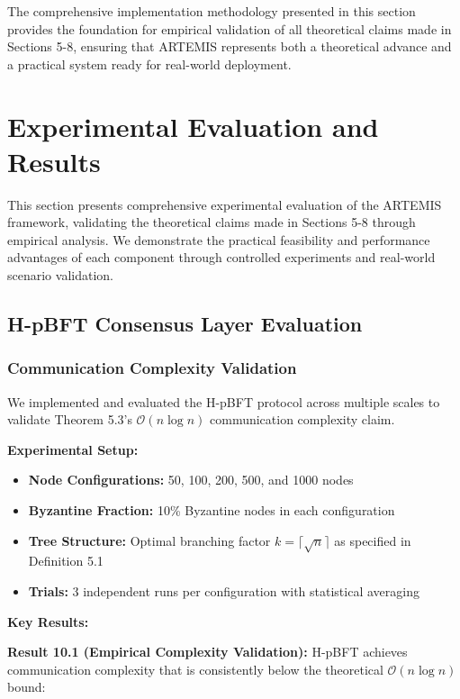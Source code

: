 \documentclass[conference]{IEEEtran}
\newcommand{\bigO}{\mathcal{O}}
\begin{document}
The comprehensive implementation methodology presented in this section provides the foundation for empirical validation of all theoretical claims made in Sections 5-8, ensuring that ARTEMIS represents both a theoretical advance and a practical system ready for real-world deployment.

\section{Experimental Evaluation and Results}

This section presents comprehensive experimental evaluation of the ARTEMIS framework, validating the theoretical claims made in Sections 5-8 through empirical analysis. We demonstrate the practical feasibility and performance advantages of each component through controlled experiments and real-world scenario validation.

\subsection{H-pBFT Consensus Layer Evaluation}

\subsubsection{Communication Complexity Validation}

We implemented and evaluated the H-pBFT protocol across multiple scales to validate Theorem 5.3's $\bigO(n \log n)$ communication complexity claim.

\textbf{Experimental Setup:}
\begin{itemize}
    \item \textbf{Node Configurations:} 50, 100, 200, 500, and 1000 nodes
    \item \textbf{Byzantine Fraction:} 10\% Byzantine nodes in each configuration
    \item \textbf{Tree Structure:} Optimal branching factor $k = \lceil \sqrt{n} \rceil$ as specified in Definition 5.1
    \item \textbf{Trials:} 3 independent runs per configuration with statistical averaging
\end{itemize}

\textbf{Key Results:}

\textbf{Result 10.1 (Empirical Complexity Validation):} H-pBFT achieves communication complexity that is consistently below the theoretical $\bigO(n \log n)$ bound:
\end{document}
